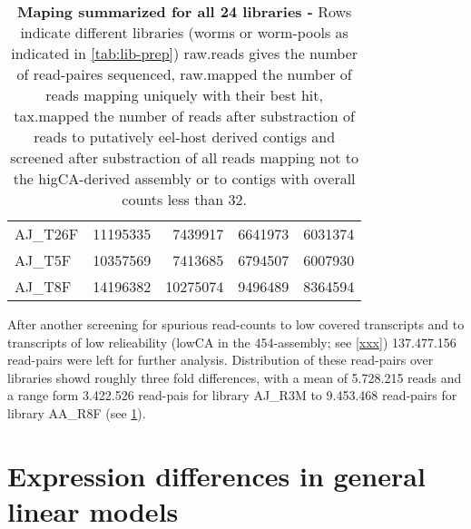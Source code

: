 \begin{table}[h]
\begin{center}
\begin{tabular}{llrrr}
  AJ\_T26F & 11195335 & 7439917 & 6641973 & 6031374 \\ 
  AJ\_T5F & 10357569 & 7413685 & 6794507 & 6007930 \\ 
  AJ\_T8F & 14196382 & 10275074 & 9496489 & 8364594 \\ 
   \hline
\end{tabular}
\caption[Mapping Summary]{\textbf{Maping summarized for all 24
    libraries -} Rows indicate different libraries (worms or
  worm-pools as indicated in \ref{tab:lib-prep}) raw.reads gives the
  number of read-paires sequenced, raw.mapped the number of reads
  mapping uniquely with their best hit, tax.mapped the number of reads
  after substraction of reads to putatively eel-host derived contigs
  and screened after substraction of all reads mapping not to the
  higCA-derived assembly or to contigs with overall counts less than
  32.}
\label{tab:read-clean}
\end{center}
\end{table}


After another screening for spurious read-counts to low covered
transcripts and to transcripts of low relieability (lowCA in the
454-assembly; see \ref{xxx}) 137.477.156 read-pairs were left for
further analysis. Distribution of these read-pairs over libraries
showd roughly three fold differences, with a mean of 5.728.215 reads
and a range form 3.422.526 read-pais for library AJ\_R3M to 9.453.468
read-pairs for library AA\_R8F (see \ref{tab:read-clean}).








\section{Expression differences in general linear models}

